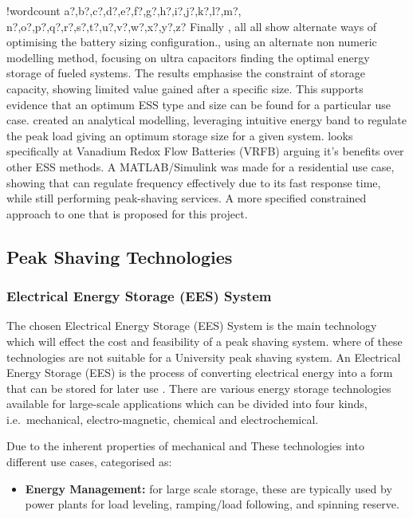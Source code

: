 \documentclass[10pt]{article}
\providecommand{\tightlist}{%
  \setlength{\itemsep}{0pt}\setlength{\parskip}{0pt}}
\newcounter{words}
\newenvironment{counted}{%
  \setcounter{words}{0}
  \SearchList!{wordcount}{\stepcounter{words}}
    {a?,b?,c?,d?,e?,f?,g?,h?,i?,j?,k?,l?,m?,
    n?,o?,p?,q?,r?,s?,t?,u?,v?,w?,x?,y?,z?}
  \UndoBoundary{'}
  \SearchOrder{p;}}{%
  \StopSearching}
\begin{document}
\begin{counted}
Finally \cite{20160601898032}, \cite{Levron201280} all \cite{5371839}
all show alternate ways of optimising the battery sizing
configuration.\cite{5371839}, using an alternate non numeric modelling
method, focusing on ultra capacitors finding the optimal energy storage
of fueled systems. The results emphasise the constraint of storage
capacity, showing limited value gained after a specific size. This
supports evidence that an optimum ESS type and size can be found for a
particular use case. \cite{Levron201280} created an analytical
modelling, leveraging intuitive energy band to regulate the peak load
giving an optimum storage size for a given system. \cite{20160601898032}
looks specifically at Vanadium Redox Flow Batteries (VRFB) arguing it's
benefits over other ESS methods. A MATLAB/Simulink was made for a
residential use case, showing that can regulate frequency effectively
due to its fast response time, while still performing peak-shaving
services. A more specified constrained approach to one that is proposed
for this project.

\subsection{Peak Shaving Technologies}\label{peak-shaving-technologies}

\subsubsection{Electrical Energy Storage (EES)
System}\label{electrical-energy-storage-ees-system}

The chosen Electrical Energy Storage (EES) System is the main technology
which will effect the cost and feasibility of a peak shaving system.
where of these technologies are not suitable for a University peak
shaving system. An Electrical Energy Storage (EES) is the process of
converting electrical energy into a form that can be stored for later
use \cite{Chen2009291}. There are various energy storage technologies
available for large-scale applications which can be divided into four
kinds, i.e.~mechanical, electro-magnetic, chemical and electrochemical.

Due to the inherent properties of mechanical and These technologies into
different use cases, categorised as:

\begin{itemize}
\tightlist
\item
  \textbf{Energy Management:} for large scale storage, these are
  typically used by power plants for load leveling, ramping/load
  following, and spinning reserve.


\end{itemize}
\end{counted}
\end{document}
